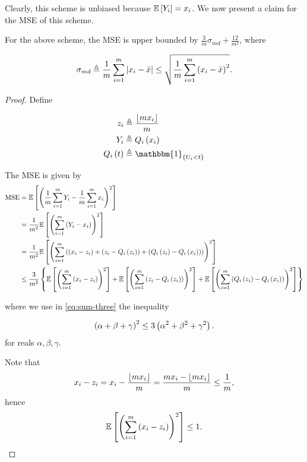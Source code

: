 \documentclass[twoside]{article}
\begin{document}
Clearly, this scheme is unbiased because \(\mathbb{E}\left[ Y_i \right] = x_i\). We now present
a claim for the MSE of this scheme.

\begin{claim}
    For the above scheme, the MSE is upper bounded by \(\frac{3}{m}\sigma_{md} + \frac{12}{m^2}\), where

    \begin{equation}
        \sigma_{md} \triangleq \frac{1}{m}\sum_{i=1}^m\left\vert x_i-\bar{x}\right\vert \le \sqrt{\frac{1}{m}\sum_{i=1}^m\left(x_i-\bar{x}\right)^2}.
        \label{eq:sigma-md-def}
    \end{equation}
\end{claim}

\begin{proof}
    Define

    \begin{align}
        z_i &\triangleq \frac{\floor{mx_i}}{m} \label{eq:zi-def} \\
        Y_i &\triangleq Q_i\brak{x_i} \label{eq:Yi-qi-def} \\
        Q_i\brak{t} &\triangleq \mathbbm{1}_{\cbrak{U_i<{t}}} \label{eq:Qi-def}
    \end{align}

    The MSE is given by
    \begin{align}
        \mathrm{MSE} &= \mathbb{E}\left[ \left(\frac{1}{m}\sum_{i=1}^mY_i - \frac{1}{m}\sum_{i=1}^mx_i\right)^2 \right] \\
                     &= \frac{1}{m^2}\mathbb{E}\left[ \left(\sum_{i=1}^m\left(Y_i-x_i\right)\right)^2 \right] \\
                     &= \frac{1}{m^2}\mathbb{E}\left[ \left(\sum_{i=1}^m\left(\left(x_i-z_i\right)+\left(z_i-Q_i\left(z_i\right)\right)+\left(Q_i\left(z_i\right)-Q_i\left(x_i\right)\right)\right)\right)^2 \right] \label{eq:sum-three} \\
                     &\le \frac{3}{m^2}\left\{\mathbb{E}\left[ \left(\sum_{i=1}^m\left(x_i-z_i\right)\right)^2 \right]+\mathbb{E}\left[ \left(\sum_{i=1}^m\left(z_i-Q_i\left(z_i\right)\right)\right)^2 \right]+\mathbb{E}\left[ \left(\sum_{i=1}^m\left(Q_i\left(z_i\right)-Q_i\left(x_i\right)\right)\right)^2 \right]\right\}
    \end{align}

    where we use in \eqref{eq:sum-three} the inequality

    \begin{equation}
        \left(\alpha+\beta+\gamma\right)^2 \le 3\left(\alpha^2+\beta^2+\gamma^2\right).
        \label{eq:sum-three-ineq}
    \end{equation}
    for reals \(\alpha,\beta,\gamma\).

    Note that
    \begin{equation}
        x_i-z_i = x_i - \frac{\lfloor mx_i\rfloor}{m} = \frac{mx_i - \lfloor mx_i\rfloor}{m} \le \frac{1}{m},
    \end{equation}
    hence
    \begin{equation}
        \mathbb{E}\left[ \left(\sum_{i=1}^m\left(x_i-z_i\right)\right)^2 \right] \le 1.
        \label{eq:term-1}
    \end{equation}


\end{proof}
\end{document}
